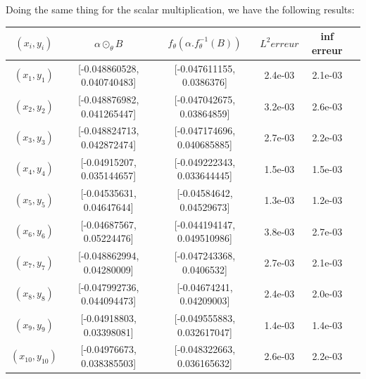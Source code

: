 \documentclass{article}
\begin{document}
            Doing the same thing for the scalar multiplication, we have the following results:\\

            \begin{tabular}{|c|c|c|c|c|c|}
                \hline
                $(x_i, y_i)$  & $ \alpha \odot_{\theta} B$ & $f_{\theta}(\alpha . f_{\theta}^{-1}(B))$ & $L^2 erreur$ & inf erreur \\
                \hline
                $(x_1, y_1)$ & [-0.048860528, 0.040740483] & [-0.047611155, 0.0386376] & 2.4e-03 & 2.1e-03 \\
                $(x_2, y_2)$ &  [-0.048876982, 0.041265447] & [-0.047042675, 0.03864859] & 3.2e-03 & 2.6e-03 \\
                $(x_3, y_3)$ & [-0.048824713, 0.042872474] & [-0.047174696, 0.040685885] & 2.7e-03 & 2.2e-03 \\
                $(x_4, y_4)$ &  [-0.04915207, 0.035144657] & [-0.049222343, 0.033644445] & 1.5e-03 & 1.5e-03 \\
                $(x_5, y_5)$ & [-0.04535631, 0.04647644] & [-0.04584642, 0.04529673] & 1.3e-03 & 1.2e-03 \\
                $(x_6, y_6)$ & [-0.04687567, 0.05224476] & [-0.044194147, 0.049510986] & 3.8e-03 & 2.7e-03 \\
                $(x_7, y_7)$ &  [-0.048862994, 0.04280009] & [-0.047243368, 0.0406532] & 2.7e-03 & 2.1e-03 \\
                $(x_8, y_8)$ & [-0.047992736, 0.044094473] & [-0.04674241, 0.04209003] & 2.4e-03 & 2.0e-03 \\
                $(x_9, y_9)$ &  [-0.04918803, 0.03398081] & [-0.049555883, 0.032617047] & 1.4e-03 & 1.4e-03 \\
                $(x_{10}, y_{10})$ & [-0.04976673, 0.038385503] & [-0.048322663, 0.036165632] & 2.6e-03 & 2.2e-03 \\
                \hline
            \end{tabular}
            \\
\end{document}
